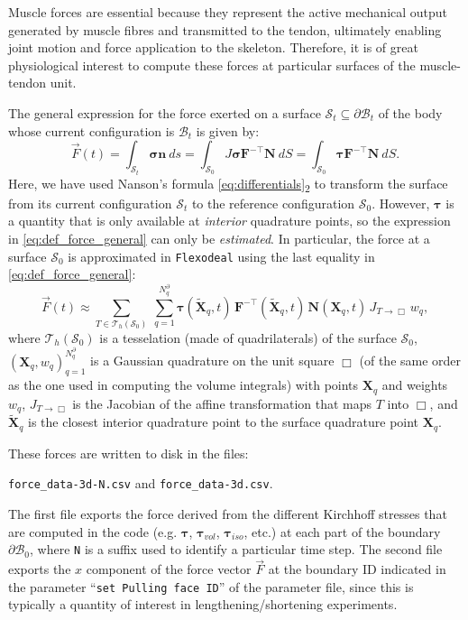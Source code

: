 \documentclass{sfuthesis}
\numberwithin{equation}{section}
\numberwithin{figure}{chapter}
\numberwithin{table}{chapter}
\theoremstyle{definition}
\def\*#1{{\mathbf{#1}}} %
\newcommand{\B}{\mathcal{B}}
\def\bsigma{{\bm{\sigma}}}
\def\btau{{\bm{\tau}}}
\begin{document}
Muscle forces are essential because they represent the active mechanical output generated by muscle fibres and transmitted to the tendon, ultimately enabling joint motion and force application to the skeleton. Therefore, it is of great physiological interest to compute these forces at particular surfaces of the muscle-tendon unit.

The general expression for the force exerted on a surface $\mathcal{S}_t \subseteq \partial \B_t$ of the body whose current configuration is $\B_t$ is given by:
\begin{equation} \label{eq:def_force_general}
    \vec{F}(t) = \int_{\mathcal{S}_t} \bsigma \*n \ ds = \int_{\mathcal{S}_0} J \bsigma \*F^{-\top} \*N \ dS = \int_{\mathcal{S}_0} \btau \*F^{-\top} \*N \ dS.
\end{equation}
Here, we have used Nanson's formula \eqref{eq:differentials}\textsubscript{2} to transform the surface from its current configuration $\mathcal{S}_t$ to the reference configuration $\mathcal{S}_0$. However, $\btau$ is a quantity that is only available at \textit{interior} quadrature points, so the expression in \eqref{eq:def_force_general} can only be \textit{estimated}. In particular, the force at a surface $\mathcal{S}_0$ is approximated in \texttt{Flexodeal} using the last equality in \eqref{eq:def_force_general}:
\begin{equation} \label{eq:def_force_approximated}
    \vec{F}(t) \approx \sum_{T \in \mathcal{T}_h(\mathcal{S}_0)} \ \sum_{q = 1}^{N_q^\partial} \btau(\widetilde{\*X}_q, t) \, \*F^{-\top}(\widetilde{\*X}_q, t) \, \*N(\*X_q, t) \, J_{T \to \Box} \, w_q,
\end{equation}
where $\mathcal{T}_h(\mathcal{S}_0)$ is a tesselation (made of quadrilaterals) of the surface $\mathcal{S}_0$, $(\*X_q, w_q)_{q = 1}^{N_q^\partial}$ is a Gaussian quadrature on the unit square $\Box$ (of the same order as the one used in computing the volume integrals) with points $\*X_q$ and weights $w_q$, $J_{T \to \Box}$ is the Jacobian of the affine transformation that maps $T$ into $\Box$, and $\widetilde{\*X}_q$ is the closest interior quadrature point to the surface quadrature point $\*X_q$.

These forces are written to disk in the files:
\begin{center}
    \texttt{force\_data-3d-N.csv} and \texttt{force\_data-3d.csv}.
\end{center}
The first file exports the force derived from the different Kirchhoff stresses that are computed in the code (e.g. $\btau$, $\btau_{vol}$, $\btau_{iso}$, etc.) at each part of the boundary $\partial \B_0$, where \texttt{N} is a suffix used to identify a particular time step. The second file exports the $x$ component of the force vector $\vec{F}$ at the boundary ID indicated in the parameter ``\texttt{set Pulling face ID}'' of the parameter file, since this is typically a quantity of interest in lengthening/shortening experiments. 
\end{document}
